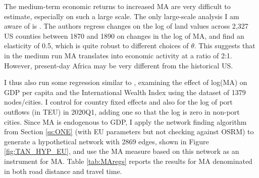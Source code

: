 \documentclass[a4paper]{article}
\begin{document}
The medium-term economic returns to increased MA are very difficult to estimate, especially on such a large scale. The only large-scale analysis I am aware of is \citet{donaldson2016railroads}. The authors regress changes on the log of land values across 2,327 US counties between 1870 and 1890 on changes in the log of MA, and find an elasticity of 0.5, which is quite robust to different choices of $\theta$. This suggests that in the medium run MA translates into economic activity at a ratio of 2:1. However, present-day Africa may be very different from the historical US. \newline

I thus also run some regression similar to \citet{donaldson2016railroads}, examining the effect of log(MA) on GDP per capita \citep{kummu2018gridded} and the International Wealth Index \citep{lee2022high} using the dataset of 1379 nodes/cities. I control for country fixed effects and also for the log of port outflows (in TEU) in 2020Q1, adding one so that the log is zero in non-port cities. Since MA is endogenous to GDP, I apply the network finding algorithm from Section \ref{ss:ONE} (with EU parameters but not checking against OSRM) to generate a hypothetical network with 2869 edges, shown in Figure \ref{fig:TAN_HYP_EU}, and use the MA measure based on this network as an instrument for MA. Table \ref{tab:MAregs} reports the results for MA denominated in both road distance and travel time. 
\end{document}
